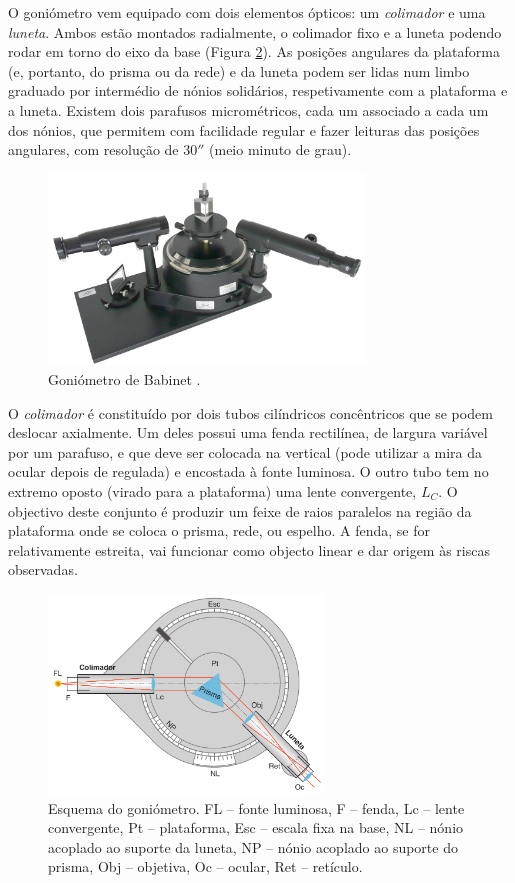 \documentclass[12pt,a4paper,oneside]{paper}
\begin{document}
O goniómetro vem equipado com dois elementos ópticos: um \emph{colimador} e uma \emph{luneta}. Ambos estão montados radialmente,
o colimador fixo e a luneta podendo rodar em torno do eixo da base (Figura \ref{fig:babinet}). As posições angulares da plataforma
(e, portanto, do prisma ou da rede) e da luneta podem ser lidas num limbo graduado por intermédio de nónios solidários, respetivamente
com a plataforma e a luneta. Existem dois parafusos micrométricos, cada um associado a cada um dos nónios, que permitem com facilidade
regular e fazer leituras das posições angulares, com resolução de $30''$ (meio minuto de grau).

\begin{figure}  
\centering 
	\includegraphics[width=0.75\textwidth]{./planck_images/goniometer}
	\caption{Goniómetro de Babinet . \label{fig:goniometer}} 
\end{figure}

O \emph{colimador} é constituído por dois tubos cilíndricos concêntricos que se podem deslocar axialmente. Um deles possui uma
fenda rectilínea, de largura variável por um parafuso, e que deve ser colocada na vertical (pode utilizar a mira da ocular depois
de regulada) e encostada à fonte luminosa. O outro tubo tem no extremo oposto (virado para a plataforma) uma lente convergente,
$L_C$. O objectivo deste conjunto é produzir um feixe de raios paralelos na região da plataforma onde se coloca o prisma, rede,
ou espelho. A fenda, se for relativamente estreita, vai funcionar como objecto linear e dar origem às riscas observadas.

\begin{figure}
	\centering 
	\includegraphics[width=0.65\textwidth]{./planck_images/Babinet}
	\caption{Esquema do goniómetro. FL -- fonte luminosa, F -- fenda, Lc -- lente convergente, Pt -- plataforma, Esc -- escala
	fixa na base, NL -- nónio acoplado ao suporte da luneta, NP -- nónio acoplado ao suporte do prisma, Obj -- objetiva, Oc -- ocular,
	Ret -- retículo.
	\label{fig:babinet}} 
\end{figure}
\end{document}
